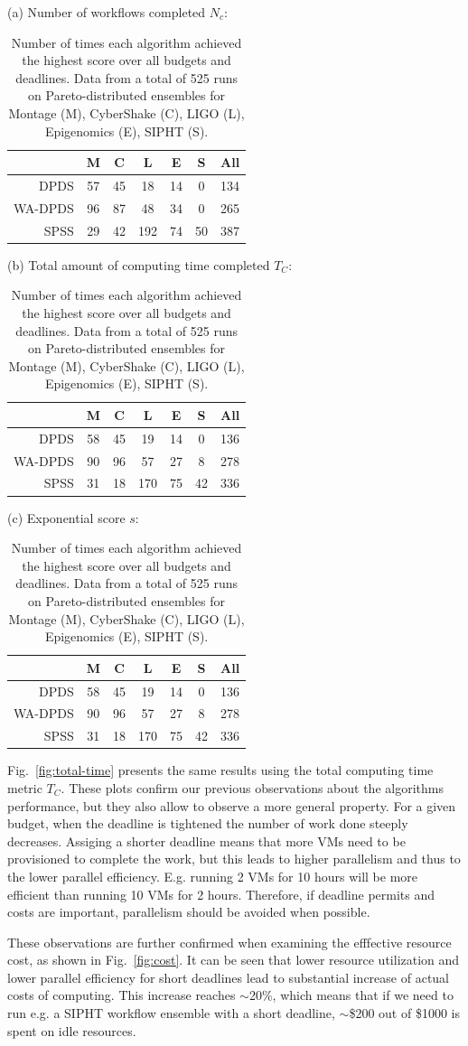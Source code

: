 \documentclass{sig-alternate}
\begin{document}
\begin{table}[tb]
\centering

(a) Number of workflows completed $N_c$:
\medskip
\begin{tabular}{r|cccccc}
 & M & C & L & E & S & All\tabularnewline
\hline
DPDS      &   57  & 45 &  18 &  14  &  0 & 134\tabularnewline
WA-DPDS   &    96 &  87  & 48  & 34  &  0 & 265\tabularnewline
SPSS     &    29  & 42  & 192  & 74  & 50 & 387\tabularnewline
\end{tabular}
\medskip

(b) Total amount of computing time completed $T_C$:
\medskip
\begin{tabular}{r|cccccc}
 & M & C & L & E & S & All\tabularnewline
\hline
DPDS      &   58  & 45 &  19 &  14  &  0 & 136\tabularnewline
WA-DPDS   &    90  & 96  & 57  & 27 &   8 & 278\tabularnewline
SPSS     &    31 &  18 &  170  & 75 &  42 & 336\tabularnewline
\end{tabular}
\medskip

(c) Exponential score $s$:
\medskip
\begin{tabular}{r|cccccc}
 & M & C & L & E & S & All\tabularnewline
\hline
DPDS      &   58  & 45 &  19 &  14  &  0 & 136\tabularnewline
WA-DPDS   &    90  & 96  & 57  & 27 &   8 & 278\tabularnewline
SPSS     &    31 &  18 &  170  & 75 &  42 & 336\tabularnewline
\end{tabular}
\medskip

\label{tab:num-dags-pareto}
\caption{Number of times each algorithm achieved the highest score 
over all budgets and deadlines. Data from a total of 525 runs on 
Pareto-distributed ensembles for Montage (M), CyberShake (C), LIGO (L), 
Epigenomics (E), SIPHT (S).}
\end{table}


Fig.~\ref{fig:total-time} presents the same results using the total computing
time metric $T_C$. These plots confirm our previous observations about the
algorithms performance, but they also allow to observe a more general property.
For a given budget, when the deadline is tightened the number of work done
steeply decreases. Assiging a shorter deadline means that more VMs need to be
provisioned to complete the work, but this leads to higher parallelism and thus
to the lower parallel efficiency. E.g. running 2 VMs for 10 hours will be more
efficient than running 10 VMs for 2 hours. Therefore, if deadline permits and
costs are important, parallelism should be avoided when possible.

These observations are further confirmed when examining the efffective resource
cost, as shown in Fig.~\ref{fig:cost}. It can be seen that lower resource
utilization and lower parallel efficiency for short deadlines lead to
substantial increase of actual costs of computing. This increase reaches
$\sim$20\%, which means that if we need to run e.g. a SIPHT workflow ensemble
with a short deadline, $\sim$\$200 out of \$1000 is spent on idle resources.
\end{document}
